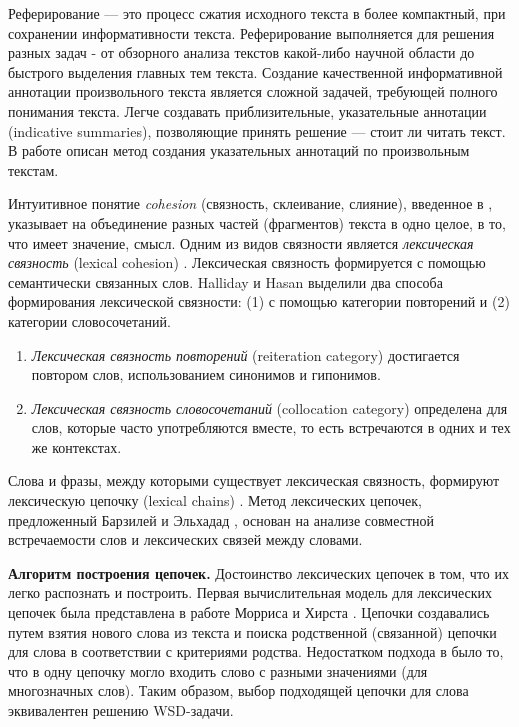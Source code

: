 \documentclass{article}
\begin{document}
\begin{articletext}
Реферирование --- это процесс сжатия исходного текста в более компактный, при сохранении информативности текста. Реферирование выполняется для решения разных задач - от обзорного анализа текстов какой-либо научной области до быстрого выделения главных тем текста. Создание качественной информативной аннотации произвольного текста является сложной задачей, требующей полного понимания текста. Легче создавать  приблизительные, указательные аннотации (indicative summaries), позволяющие принять решение --- стоит ли читать текст. В работе \cite{Barzilay Elhadad 1997} описан метод создания указательных аннотаций по произвольным текстам.

Интуитивное понятие \textit{cohesion} (связность, склеивание, слияние), введенное в \cite{Halliday Hasan 1976}, указывает на объединение разных частей (фрагментов) текста в одно целое, в то, что имеет значение, смысл. Одним из видов связности является \textit{лексическая связность} (lexical cohesion) \cite{Hoey 1991}. Лексическая связность формируется с помощью семантически связанных слов. Halliday и Hasan \cite{Halliday Hasan 1976} выделили  два способа формирования лексической связности: (1) с помощью категории повторений и (2) категории словосочетаний. 

\begin{enumerate} 
\item \textit{Лексическая связность повторений} (reiteration category) достигается повтором слов, использованием синонимов и гипонимов. 
\item \textit{Лексическая связность словосочетаний} (collocation category) определена для слов, которые часто употребляются вместе, то есть встречаются в одних и тех же контекстах.
\end{enumerate}

Слова и фразы, между которыми существует лексическая связность, формируют лексическую цепочку (lexical chains) \cite{Hoey 1991}. Метод лексических цепочек, предложенный Барзилей и Эльхадад \cite{Barzilay Elhadad 1997}, основан на анализе совместной встречаемости слов и лексических связей между словами. 

\textbf{Алгоритм построения цепочек.} Достоинство лексических цепочек в том, что их легко распознать и построить. Первая вычислительная модель для лексических цепочек была представлена в работе Морриса и Хирста \cite{Hoey 1991}. Цепочки создавались путем взятия нового слова из текста и поиска родственной (связанной) цепочки для слова в соответствии с критериями родства. Недостатком подхода в \cite{Hoey 1991} было то, что в одну цепочку могло входить слово с разными значениями (для многозначных слов). Таким образом, выбор подходящей цепочки для слова эквивалентен решению WSD-задачи.


\end{articletext}
\end{document}
